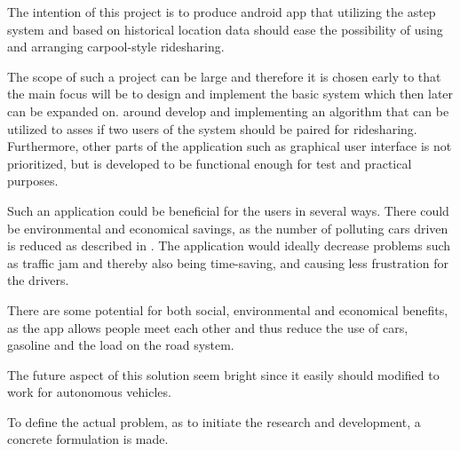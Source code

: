 The intention of this project is to produce \DIFdelbegin {}\DIFdelend \DIFaddbegin {}\DIFaddend android app that utilizing the \gls{astep} system and based on historical location data should ease the possibility of using and arranging carpool-style ridesharing.

The scope of such a project can be large and therefore it is chosen early to that the main focus will be to design and implement the basic system which then later can be expanded on.
\DIFdelbegin {}\DIFdelend \DIFaddbegin {}\DIFaddend around develop and implementing an algorithm that can be utilized to asses if two users of the system should be paired for ridesharing.
\DIFdelbegin {}\DIFdelend Furthermore, other parts of the application such as graphical user interface is not prioritized, but is developed to be functional enough for test and practical purposes.

Such an application could be beneficial for the users in several ways. There could be environmental and economical savings, as the number of polluting cars driven is reduced as described in \cite{doi:10.1080/01441647.2011.621557}. The application would ideally decrease \DIFdelbegin {}\DIFdelend \DIFaddbegin {}\DIFaddend problems such as traffic jam and thereby also being time-saving, and causing less frustration for the drivers.

There are some potential for both social, environmental and economical benefits, as the app allows people meet each other and thus reduce the use of cars, gasoline and the load on the road system.
\DIFdelbegin %

\DIFdelend The future aspect of this solution seem bright since it easily should modified to work for autonomous vehicles.

To define the actual problem, as to initiate the research and development, a concrete formulation is made.
